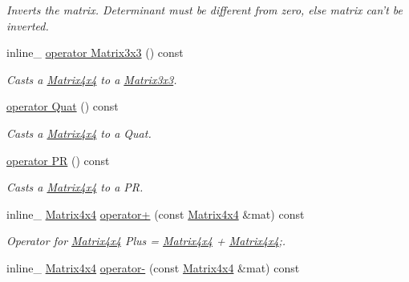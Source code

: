 \begin{DoxyCompactItemize}
\begin{DoxyCompactList}\small\item\em Inverts the matrix. Determinant must be different from zero, else matrix can't be inverted. \end{DoxyCompactList}\item 
\hypertarget{class_matrix4x4_a0d7fc2502933e85a83490f07c1ea1be5}{inline\+\_\+ \hyperlink{class_matrix4x4_a0d7fc2502933e85a83490f07c1ea1be5}{operator Matrix3x3} () const }\label{class_matrix4x4_a0d7fc2502933e85a83490f07c1ea1be5}

\begin{DoxyCompactList}\small\item\em Casts a \hyperlink{class_matrix4x4}{Matrix4x4} to a \hyperlink{class_matrix3x3}{Matrix3x3}. \end{DoxyCompactList}\item 
\hypertarget{class_matrix4x4_a1dde2efce6464424b72d9f1dc44d26d2}{\hyperlink{class_matrix4x4_a1dde2efce6464424b72d9f1dc44d26d2}{operator Quat} () const }\label{class_matrix4x4_a1dde2efce6464424b72d9f1dc44d26d2}

\begin{DoxyCompactList}\small\item\em Casts a \hyperlink{class_matrix4x4}{Matrix4x4} to a Quat. \end{DoxyCompactList}\item 
\hypertarget{class_matrix4x4_a37307ac629fbb3b670d54adf5edb0c2b}{\hyperlink{class_matrix4x4_a37307ac629fbb3b670d54adf5edb0c2b}{operator P\+R} () const }\label{class_matrix4x4_a37307ac629fbb3b670d54adf5edb0c2b}

\begin{DoxyCompactList}\small\item\em Casts a \hyperlink{class_matrix4x4}{Matrix4x4} to a P\+R. \end{DoxyCompactList}\item 
\hypertarget{class_matrix4x4_a8dbb55175843512fed26857e5aedbb95}{inline\+\_\+ \hyperlink{class_matrix4x4}{Matrix4x4} \hyperlink{class_matrix4x4_a8dbb55175843512fed26857e5aedbb95}{operator+} (const \hyperlink{class_matrix4x4}{Matrix4x4} \&mat) const }\label{class_matrix4x4_a8dbb55175843512fed26857e5aedbb95}

\begin{DoxyCompactList}\small\item\em Operator for \hyperlink{class_matrix4x4}{Matrix4x4} Plus = \hyperlink{class_matrix4x4}{Matrix4x4} + \hyperlink{class_matrix4x4}{Matrix4x4};. \end{DoxyCompactList}\item 
\hypertarget{class_matrix4x4_a196ef375611a481f1f5ce644d87aae28}{inline\+\_\+ \hyperlink{class_matrix4x4}{Matrix4x4} \hyperlink{class_matrix4x4_a196ef375611a481f1f5ce644d87aae28}{operator-\/} (const \hyperlink{class_matrix4x4}{Matrix4x4} \&mat) const }\label{class_matrix4x4_a196ef375611a481f1f5ce644d87aae28}


\end{DoxyCompactItemize}
